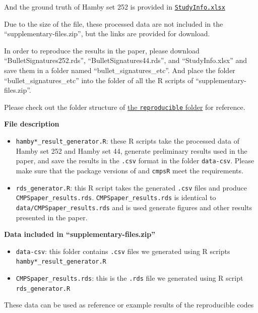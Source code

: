 And the ground truth of Hamby set 252 is provided in
\href{https://github.com/willju-wangqian/CMPSpaper/blob/main/reproducible/bullet_signatures_etc/StudyInfo.xlsx}{\texttt{StudyInfo.xlsx}}

Due to the size of the file, these processed data are not included in
the ``supplementary-files.zip'', but the links are provided for
download.

In order to reproduce the results in the paper, please download
``BulletSignatures252.rds'', ``BulletSignatures44.rds'', and
``StudyInfo.xlsx'' and save them in a folder named
``bullet\_signatures\_etc''. And place the folder
``bullet\_signatures\_etc'' into the folder of all the R scripts of
``supplementary-files.zip''.

Please check out the folder structure of
\href{https://github.com/willju-wangqian/CMPSpaper/tree/main/reproducible}{the
\texttt{reproducible} folder} for reference.

\textbf{File description}

\begin{itemize}
\tightlist
\item
  \texttt{hamby*\_result\_generator.R}: these R scripts take the
  processed data of Hamby set 252 and Hamby set 44, generate preliminary
  results used in the paper, and save the results in the \texttt{.csv}
  format in the folder \texttt{data-csv}. Please make sure that the
  package versions of  and \texttt{cmpsR} meet the
  requirements.
\item
  \texttt{rds\_generator.R}: this R script takes the generated
  \texttt{.csv} files and produce \texttt{CMPSpaper\_results.rds}.
  \texttt{CMPSpaper\_results.rds} is identical to
  \texttt{data/CMPSpaper\_results.rds} and is used generate figures and
  other results presented in the paper.
\end{itemize}

\textbf{Data included in ``supplementary-files.zip''}

\begin{itemize}
\tightlist
\item
  \texttt{data-csv}: this folder contains \texttt{.csv} files we
  generated using R scripts \texttt{hamby*\_result\_generator.R}
\item
  \texttt{CMPSpaper\_results.rds}: this is the \texttt{.rds} file we
  generated using R script \texttt{rds\_generator.R}
\end{itemize}

These data can be used as reference or example results of the
reproducible codes

